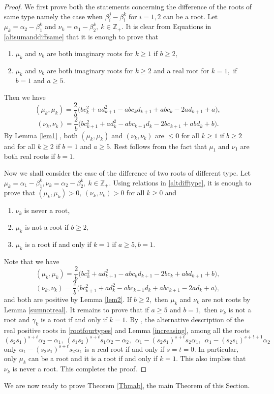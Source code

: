 \documentclass[12pt,reqno]{amsart}
\theoremstyle{plain}
\theoremstyle{definition}
\theoremstyle{remark}
\newcommand\bz{\mathbb Z}
\begin{document}
\begin{proof}
We first prove both the statements concerning the difference of the roots of same type namely the case when $\beta_i^j-\beta_i^k$ for $i=1,2$ can be a root. Let $\mu_k=\alpha_2-\beta_{1}^{k}$ and $\nu_k=\alpha_1-\beta_2^k,\ k\in\bz_+.$  It is clear from Equations in \ref{altsumanddiffsame} that it is enough to prove that
    \begin{enumerate}
    \item $\mu_k$ and $\nu_{k}$ are both imaginary roots for $k\geq 1$ if $b\geq 2,$
    \item $\mu_{k}$ and $\nu_{k}$ are both imaginary roots for $k\geq 2$ and a real root for $k=1,$ if $b=1$ and $a\geq 5.$
    \end{enumerate} 
    Then we have 
    $$(\mu_k,\mu_k)=\frac{2}{b}\bigg(bc_k^2+ad_{k+1}^2-abc_kd_{k+1}+abc_{k}-2ad_{k+1}+a\bigg),$$
    $$(\nu_k,\nu_k)=\frac{2}{b}\bigg(bc_{k+1}^2+ad_k^2-abc_{k+1}d_k-2bc_{k+1}+abd_k+b\bigg).$$ By Lemma \ref{lem1} , both $(\mu_k,\mu_k)$ and $(\nu_k,\nu_k)$ are $\le 0$ for all $k\geq 1$ if $b\geq 2$ and for all $k\geq 2$ if $b=1$ and $a\geq 5.$ Rest follows from the fact that $\mu_1$ and $\nu_1$ are both real roots if $b=1$.

    Now we shall consider the case of the difference of two roots of different type. Let $\mu_k=\alpha_1-\beta_{1}^{k},\nu_k=\alpha_2-\beta_{2}^{k},\ k\in\bz_+.$ Using relations in \ref{altdifftype}, it is enough to prove  that $(\mu_k,\mu_k)>0,\ (\nu_k,\nu_k)>0$ for all $k\geq 0$ and 
\begin{enumerate}
    \item $\nu_k$ is never a root,
    \item $\mu_k$ is not a root if $b\geq 2,$
    \item $\mu_k$ is a root if and only if $k=1$ if $a\geq 5,b=1.$
\end{enumerate}
Note that we have 
$$(\mu_k,\mu_k)=\frac{2}{b}\bigg(bc_k^2+ad_{k+1}^2-abc_kd_{k+1}-2bc_k+abd_{k+1}+b\bigg),$$
$$(\nu_k,\nu_k)=\frac{2}{b}\bigg(bc_{k+1}^2+ad_{k}^2-abc_{k+1}d_{k}+abc_{k+1}-2ad_{k}+a\bigg),$$
and both are positive by Lemma \ref{lem2}. If $b\geq 2,$ then $\mu_k$ and $\nu_k$ are not roots by Lemma \ref{sumnotreal}. It remains to prove that if $a\geq 5$ and $b=1,$ then $\nu_k$ is not a root and $\gamma_k$ is a root if and only if $k=1.$ By \cite[Theorem 3.6]{carbone2021commutator}, the alternative description of the real positive roots in \ref{rootfourtypes} and  Lemma \ref{increasing}, among all the roots 
$$(s_2s_1)^{s+t}\alpha_2-\alpha_1,\ (s_1s_2)^{s+t}s_1\alpha_2-\alpha_2,\ \ \alpha_1-(s_2s_1)^{s+t}s_2\alpha_1,\ \ \alpha_1-(s_2s_1)^{s+t+1}\alpha_2$$  only $\alpha_1-(s_2s_1)^{s+t}s_2\alpha_1$ is a real root if and only if $s=t=0.$  In particular, only $\mu_k$ can be a root and it is a root if and only if $k=1.$ This also implies that $\nu_k$ is never a root. This completes the proof.
\end{proof}
\noindent We are now ready to prove Theorem \ref{Thmab}, the main Theorem of this Section.\medskip
\end{document}
